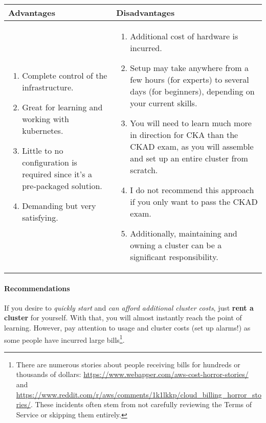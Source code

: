 \begin{tabularx}{\textwidth}{|X|X|}
	\hline
	\cellcolor{DarkOliveGreen2}\textbf{Advantages} & \cellcolor{Tomato1}\textbf{Disadvantages} \\
	\hline
	\begin{enumerate}
		\item Complete control of the infrastructure.
		\item Great for learning and working with kubernetes.
		\item Little to no configuration is required since it's a pre-packaged solution.
		\item Demanding but very satisfying. 
	\end{enumerate}
	
	&
	
	\begin{enumerate}
		\item Additional cost of hardware is incurred.
		\item Setup may take anywhere from a few hours (for experts) to several days (for beginners), depending on your current skills.
		\item You will need to learn much more in direction for CKA than the CKAD exam, as you will assemble and set up an entire cluster from scratch.
		\item I do not recommend this approach if you only want to pass the CKAD exam.
		\item Additionally, maintaining and owning a cluster can be a significant responsibility.
	\end{enumerate}\\
	\hline
\end{tabularx}

\paragraph{Recommendations} 
If you desire to \textit{quickly start} and \textit{can afford additional cluster costs}, just \textbf{rent a cluster} for yourself. With that, you will almost instantly reach the point of learning. However, pay attention to usage and cluster costs (set up alarms!) as some people have incurred large bills\footnote{There are numerous stories about people receiving bills for hundreds or thousands of dollars: \url{https://www.webapper.com/aws-cost-horror-stories/} and \url{https://www.reddit.com/r/aws/comments/1k1lkkp/cloud_billing_horror_stories/}. These incidents often stem from not carefully reviewing the Terms of Service or skipping them entirely.}.\\

